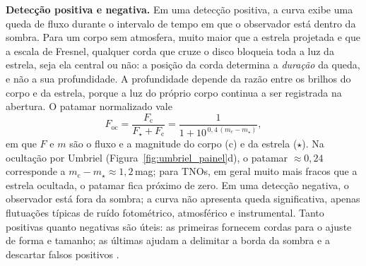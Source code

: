 \textbf{Detecção positiva e negativa.} Em uma detecção positiva, a curva exibe uma queda de fluxo durante o intervalo de tempo em que o observador está dentro da sombra. Para um corpo sem atmosfera, muito maior que a estrela projetada e que a escala de Fresnel, qualquer corda que cruze o disco bloqueia toda a luz da estrela, seja ela central ou não: a posição da corda determina a \emph{duração} da queda, e não a sua profundidade. A profundidade depende da razão entre os brilhos do corpo e da estrela, porque a luz do próprio corpo continua a ser registrada na abertura. O patamar normalizado vale
\[
F_{\mathrm{oc}} = \frac{F_{\mathrm{c}}}{F_{\star}+F_{\mathrm{c}}} = \frac{1}{1+10^{\,0{,}4\,(m_{\mathrm{c}}-m_{\star})}},
\]
em que \(F\) e \(m\) são o fluxo e a magnitude do corpo (c) e da estrela (\(\star\)). Na ocultação por Umbriel (Figura~\ref{fig:umbriel_painel}d), o patamar \(\approx 0{,}24\) corresponde a \(m_{\mathrm{c}}-m_{\star} \approx 1{,}2\)\,mag; para TNOs, em geral muito mais fracos que a estrela ocultada, o patamar fica próximo de zero. Em uma detecção negativa, o observador está fora da sombra; a curva não apresenta queda significativa, apenas flutuações típicas de ruído fotométrico, atmosférico e instrumental. Tanto positivas quanto negativas são úteis: as primeiras fornecem cordas para o ajuste de forma e tamanho; as últimas ajudam a delimitar a borda da sombra e a descartar falsos positivos \citep{SORA2022}.

